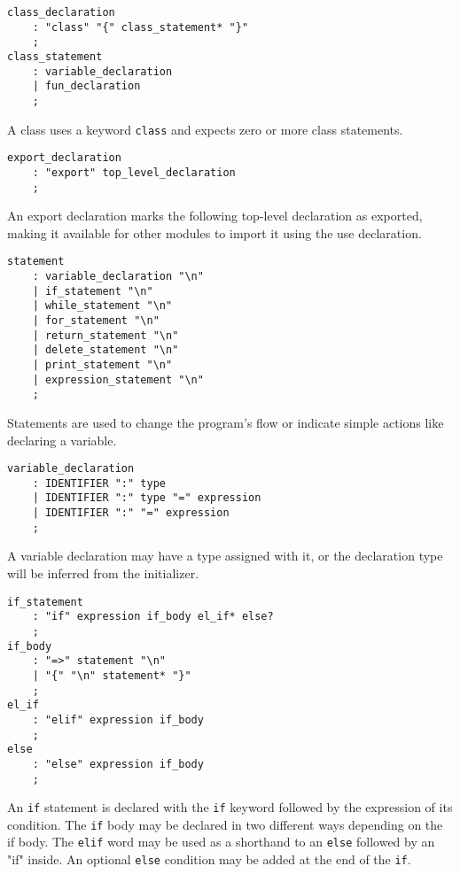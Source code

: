 \clearpage

\begin{lstlisting}
class_declaration
    : "class" "{" class_statement* "}"
    ;
class_statement
    : variable_declaration
    | fun_declaration
    ;
\end{lstlisting}

A class uses a keyword \texttt{class} and expects zero or more class statements.

\begin{lstlisting}
export_declaration
    : "export" top_level_declaration
    ;
\end{lstlisting}

An export declaration marks the following top-level declaration as exported, making it available for other modules to import it using the
use declaration.

\begin{lstlisting}
statement
    : variable_declaration "\n"
    | if_statement "\n"
    | while_statement "\n"
    | for_statement "\n"
    | return_statement "\n"
    | delete_statement "\n"
    | print_statement "\n"
    | expression_statement "\n"
    ;
\end{lstlisting}

Statements are used to change the program's flow or indicate simple actions like declaring a variable.

\begin{lstlisting}
variable_declaration
    : IDENTIFIER ":" type
    | IDENTIFIER ":" type "=" expression
    | IDENTIFIER ":" "=" expression
    ;
\end{lstlisting}

A variable declaration may have a type assigned with it, or the declaration type will be inferred from the initializer.

\clearpage

\begin{lstlisting}
if_statement
    : "if" expression if_body el_if* else?
    ;
if_body
    : "=>" statement "\n"
    | "{" "\n" statement* "}"
    ;
el_if
    : "elif" expression if_body
    ;
else
    : "else" expression if_body
    ;
\end{lstlisting}

An \texttt{if} statement is declared with the \texttt{if} keyword followed by the expression of its condition.
The \texttt{if} body may be declared in two different ways depending on the if body. The \texttt{elif} word may be used as a shorthand
to an \texttt{else} followed by an "if" inside. An optional \texttt{else} condition may be added at the end of the \texttt{if}.

